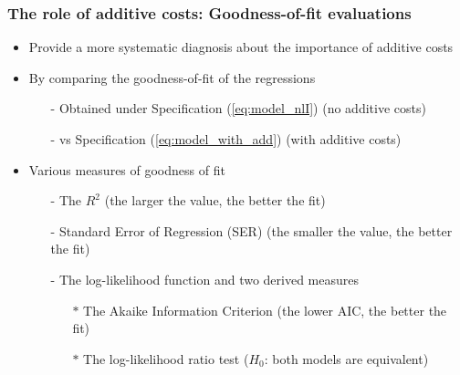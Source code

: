 \documentclass[10 pt,Helvetica, french]{beamer}
\begin{document}
\begin{frame}
\frametitle{The role of additive costs: Goodness-of-fit evaluations}
\begin{itemize}
\item Provide a more systematic diagnosis about the importance of additive costs  \vspace{0.1cm}
\item By comparing the goodness-of-fit of the regressions
\begin{itemize}
\item[-] Obtained under Specification (\ref{eq:model_nlI}) (no additive costs)
\item[-] vs Specification (\ref{eq:model_with_add}) (with additive costs) \vspace{0.1cm}
\end{itemize}
\item Various measures of goodness of fit
\begin{itemize}
\item[-] The $R^2$ (the larger the value, the better the fit) \vspace{0.1cm}
\item[-] Standard Error of Regression (SER) (the smaller the value, the better the fit) \vspace{0.1cm}
\item[-] The log-likelihood function and two derived measures \vspace{0.1cm}
\begin{itemize}
\item[$\ast$] The Akaike Information Criterion (the lower AIC, the better the fit) \vspace{0.1cm}
\item[$\ast$] The log-likelihood ratio test ($H_0$: both models are equivalent)
\end{itemize}
\end{itemize}

\end{itemize}

\end{frame}
\end{document}
